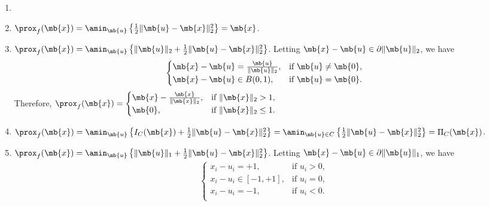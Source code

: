 \begin{exercise}
\begin{enumerate}
            \begin{solution}
                \begin{enumerate}
                    \item []
                    \item $\prox_f(\mb{x})=\amin_{\mb{u}}\left\{\frac{1}{2}\|\mb{u}-\mb{x}\|_2^2\right\}=\mb{x}$.
                    \item $\prox_f(\mb{x})=\amin_{\mb{u}}\left\{\|\mb{u}\|_2+\frac{1}{2}\|\mb{u}-\mb{x}\|_2^2\right\}$. Letting $\mb{x} - \mb{u} \in \partial \|\mb{u}\|_2$, we have
                        \begin{align*}
                            \begin{cases}
                                \mb{x} - \mb{u} = \frac{\mb{u}}{\|\mb{u}\|_2}, & \text{if } \mb{u}\neq \mb{0}, \\
                                \mb{x} - \mb{u} \in B(0,1),                    & \text{if } \mb{u}=\mb{0}.
                            \end{cases}
                        \end{align*}
                        Therefore, $\prox_f(\mb{x})=\begin{cases}
                                \mb{x}-\frac{\mb{x}}{\|\mb{x}\|_2}, & \text{if } \|\mb{x}\|_2 > 1,   \\
                                \mb{0},                             & \text{if } \|\mb{x}\|_2 \le 1.
                            \end{cases}$
                    \item $\prox_f(\mb{x})=\amin_{\mb{u}}\left\{I_C(\mb{x})+\frac{1}{2}\|\mb{u}-\mb{x}\|_2^2\right\}=\amin_{\mb{u}\in C}\left\{\frac{1}{2}\|\mb{u}-\mb{x}\|_2^2\right\} = \Pi_C(\mb{x})$.
                    \item $\prox_f(\mb{x})=\amin_{\mb{u}}\left\{\|\mb{u}\|_1+\frac{1}{2}\|\mb{u}-\mb{x}\|_2^2\right\}$. Letting $\mb{x} - \mb{u} \in \partial \|\mb{u}\|_1$, we have
                        \begin{align*}
                            \begin{cases}
                                x_i - u_i = +1,        & \text{if } u_i > 0, \\
                                x_i - u_i \in [-1,+1], & \text{if } u_i = 0, \\
                                x_i - u_i = -1,        & \text{if } u_i < 0. \\
                            \end{cases}

\end{align*}
\end{enumerate}
\end{solution}
\end{enumerate}
\end{exercise}
